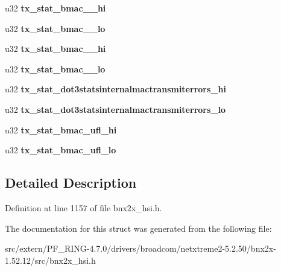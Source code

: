 \begin{DoxyCompactItemize}
\item 
\hypertarget{structmac__stx_ab1de2e5b553eab69a4dc7e42e38ad0c0}{
u32 {\bfseries tx\_\-stat\_\-bmac\_\_\-hi}}
\label{structmac__stx_ab1de2e5b553eab69a4dc7e42e38ad0c0}

\item 
\hypertarget{structmac__stx_ae0be5e8b5a450b7eb73fb425c1988d6c}{
u32 {\bfseries tx\_\-stat\_\-bmac\_\_\-lo}}
\label{structmac__stx_ae0be5e8b5a450b7eb73fb425c1988d6c}

\item 
\hypertarget{structmac__stx_aa3839decd7238ffc5f50ce379e8b6268}{
u32 {\bfseries tx\_\-stat\_\-bmac\_\_\-hi}}
\label{structmac__stx_aa3839decd7238ffc5f50ce379e8b6268}

\item 
\hypertarget{structmac__stx_a9a3c07c08ac84edc1d851dc46a410914}{
u32 {\bfseries tx\_\-stat\_\-bmac\_\_\-lo}}
\label{structmac__stx_a9a3c07c08ac84edc1d851dc46a410914}

\item 
\hypertarget{structmac__stx_a3fb20cd4c93139a66b537435c760f1dd}{
u32 {\bfseries tx\_\-stat\_\-dot3statsinternalmactransmiterrors\_\-hi}}
\label{structmac__stx_a3fb20cd4c93139a66b537435c760f1dd}

\item 
\hypertarget{structmac__stx_aadb6777db2578b2b3b0d0bb877b04e27}{
u32 {\bfseries tx\_\-stat\_\-dot3statsinternalmactransmiterrors\_\-lo}}
\label{structmac__stx_aadb6777db2578b2b3b0d0bb877b04e27}

\item 
\hypertarget{structmac__stx_ae43d135ba3f492372fac5c6a42823035}{
u32 {\bfseries tx\_\-stat\_\-bmac\_\-ufl\_\-hi}}
\label{structmac__stx_ae43d135ba3f492372fac5c6a42823035}

\item 
\hypertarget{structmac__stx_a8825d07ec67db1296517a7c25477e4a5}{
u32 {\bfseries tx\_\-stat\_\-bmac\_\-ufl\_\-lo}}
\label{structmac__stx_a8825d07ec67db1296517a7c25477e4a5}

\end{DoxyCompactItemize}


\subsection{Detailed Description}


Definition at line 1157 of file bnx2x\_\-hsi.h.



The documentation for this struct was generated from the following file:\begin{DoxyCompactItemize}
\item 
src/extern/PF\_\-RING-\/4.7.0/drivers/broadcom/netxtreme2-\/5.2.50/bnx2x-\/1.52.12/src/bnx2x\_\-hsi.h\end{DoxyCompactItemize}

